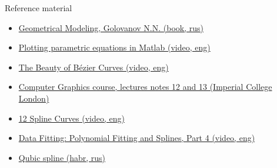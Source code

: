 \documentclass[aspectratio=169]{beamer}
\newcommand{\fbckg}[1]{\usebackgroundtemplate{\texttt{[image: \#1]}}}%
\begin{document}
\begin{frame}[t]{Reference material}
    \begin{itemize}
        \item \href{https://libgen.is/book/index.php?md5=D650EF9E78CBCD3367240A00B610C383}{Geometrical Modeling, Golovanov N.N. (book, rus)}
        \item \href{https://www.youtube.com/watch?v=PSe47Q7QLmE}{Plotting parametric equations in Matlab (video, eng)}
        \item \href{https://youtu.be/aVwxzDHniEw}{The Beauty of Bézier Curves (video, eng)}
        \item \href{http://wp.doc.ic.ac.uk/bkainz/teaching/60005-co317-computer-graphics/}{Computer Graphics course, lectures notes 12 and 13 (Imperial College London)}
        \item \href{https://www.youtube.com/watch?v=lk3uObcVnN0}{12 Spline Curves (video, eng)}
        \item \href{https://youtu.be/rtwOrZL02M0}{Data Fitting: Polynomial Fitting and Splines, Part 4 (video, eng)}
        \item \href{https://habr.com/ru/post/323442/}{Qubic spline (habr, rus)}
    \end{itemize}
\end{frame}

\fbckg{fibeamer/figs/last_page.png}
\frame[plain]{}
\end{document}
